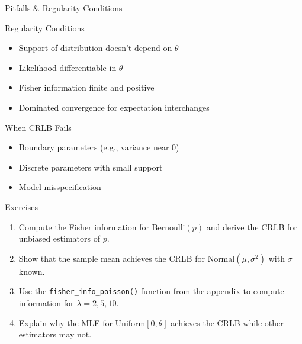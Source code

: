 \begin{frame}{Pitfalls \& Regularity Conditions}
  \begin{block}{Regularity Conditions}
    \begin{itemize}
      \item Support of distribution doesn't depend on $\theta$
      \item Likelihood differentiable in $\theta$
      \item Fisher information finite and positive
      \item Dominated convergence for expectation interchanges
    \end{itemize}
  \end{block}

  \begin{block}{When CRLB Fails}
    \begin{itemize}
      \item Boundary parameters (e.g., variance near 0)
      \item Discrete parameters with small support
      \item Model misspecification
    \end{itemize}
  \end{block}
\end{frame}

\begin{frame}{Exercises}
  \begin{enumerate}
    \item Compute the Fisher information for Bernoulli$(p)$ and derive the CRLB for unbiased estimators of $p$.
    \item Show that the sample mean achieves the CRLB for Normal$(\mu, \sigma^2)$ with $\sigma$ known.
    \item Use the \texttt{fisher\_info\_poisson()} function from the appendix to compute information for $\lambda = 2, 5, 10$.
    \item Explain why the MLE for Uniform$[0, \theta]$ achieves the CRLB while other estimators may not.
  \end{enumerate}
\end{frame}

